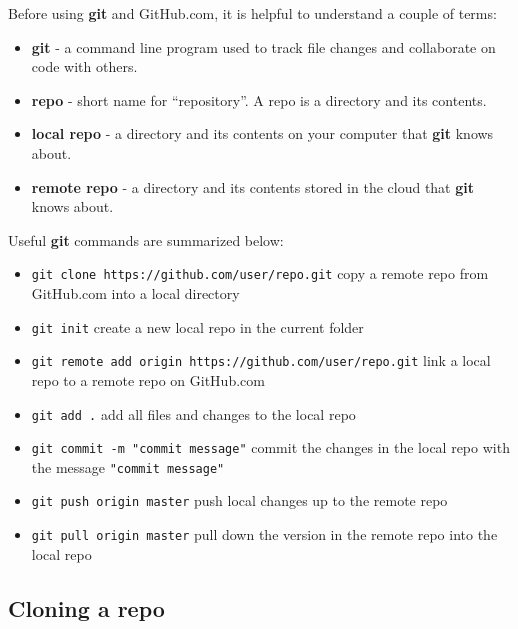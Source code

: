 \documentclass{book}
\providecommand{\tightlist}{%
      \setlength{\itemsep}{0pt}\setlength{\parskip}{0pt}}
\begin{document}
    
        Before using \textbf{git} and GitHub.com, it is helpful to understand a
couple of terms:

\begin{itemize}
\tightlist
\item
  \textbf{git} - a command line program used to track file changes and
  collaborate on code with others.
\item
  \textbf{repo} - short name for ``repository''. A repo is a directory
  and its contents.
\item
  \textbf{local repo} - a directory and its contents on your computer
  that \textbf{git} knows about.
\item
  \textbf{remote repo} - a directory and its contents stored in the
  cloud that \textbf{git} knows about.
\end{itemize}
    




    
        Useful \textbf{git} commands are summarized below:

\begin{itemize}
\item
  \lstinline!git clone https://github.com/user/repo.git! copy a remote
  repo from GitHub.com into a local directory
\item
  \lstinline!git init! create a new local repo in the current folder
\item
  \lstinline!git remote add origin https://github.com/user/repo.git!
  link a local repo to a remote repo on GitHub.com
\item
  \lstinline!git add .! add all files and changes to the local repo
\item
  \lstinline!git commit -m "commit message"! commit the changes in the
  local repo with the message \lstinline!"commit message"!
\item
  \lstinline!git push origin master! push local changes up to the remote
  repo
\item
  \lstinline!git pull origin master! pull down the version in the remote
  repo into the local repo
\end{itemize}
    




    
        \subsection{Cloning a repo}\label{cloning-a-repo}
    
\end{document}
